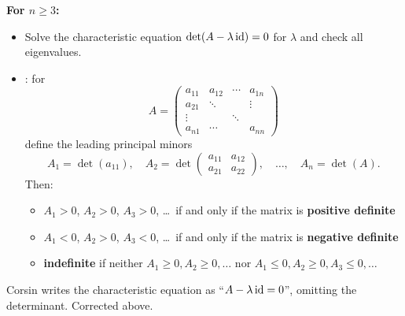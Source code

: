 \textbf{For $n \geq 3$:}
\begin{itemize}
  \item Solve the characteristic equation $\det(A - \lambda\operatorname{id}) = 0$ for $\lambda$ and check all
    eigenvalues.
  \item {} : for
    \[A = \begin{pmatrix} a_{11} & a_{12} & \cdots & a_{1n} \\ a_{21} & \ddots & & \vdots \\ \vdots & & \ddots & \\ a_{n1} & \cdots & & a_{nn}\end{pmatrix}\]
    define the leading principal minors
    \[A_1 = \det(a_{11}), \quad A_2 = \det\begin{pmatrix} a_{11} & a_{12} \\ a_{21} & a_{22}\end{pmatrix}, \quad \dots, \quad A_n = \det(A).\]
    Then:
    \begin{itemize}
      \item $A_1 > 0$, $A_2 > 0$, $A_3 > 0$, \ldots\ if and only if the matrix is \textbf{positive definite}
      \item $A_1 < 0$, $A_2 > 0$, $A_3 < 0$, \ldots\ if and only if the matrix is \textbf{negative definite}
      \item \textbf{indefinite} if neither $A_1 \geq 0, A_2 \geq 0, \dots$ nor
        $A_1 \leq 0, A_2 \geq 0, A_3 \leq 0, \dots$
    \end{itemize}
\end{itemize}

\begin{ainote}
Corsin writes the characteristic equation as ``$A - \lambda\operatorname{id} = 0$'', omitting the determinant.
Corrected above.
\end{ainote}

